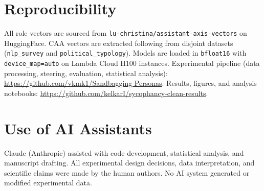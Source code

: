 \documentclass{article}
\theoremstyle{plain}
\theoremstyle{definition}
\theoremstyle{remark}
\begin{document}
\section{Reproducibility}\label{app:repro}
All role vectors are sourced from \texttt{lu-christina/assistant-axis-vectors} on HuggingFace. CAA vectors are extracted following \citet{rimsky2024} from disjoint datasets (\texttt{nlp\_survey} and \texttt{political\_typology}). Models are loaded in \texttt{bfloat16} with \texttt{device\_map=auto} on Lambda Cloud H100 instances. Experimental pipeline (data processing, steering, evaluation, statistical analysis): \url{https://github.com/vkmk1/Sandbagging-Personas}. Results, figures, and analysis notebooks: \url{https://github.com/kelkarI/sycophancy-clean-results}.

\section{Use of AI Assistants}\label{app:ai}
Claude (Anthropic) assisted with code development, statistical analysis, and manuscript drafting. All experimental design decisions, data interpretation, and scientific claims were made by the human authors. No AI system generated or modified experimental data.

\end{document}
